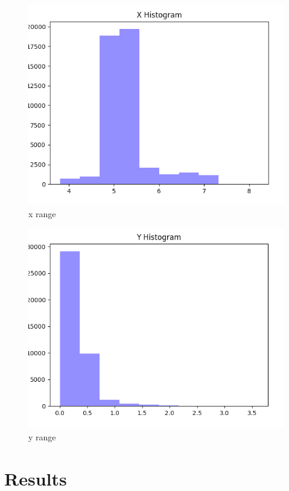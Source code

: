 \documentclass[12pt, a4paper, twocolumn, fullpage]{article}
\theoremstyle{plain}
\theoremstyle{definition}
\theoremstyle{remark}
\begin{document}
\begin{figure}[t]
	\includegraphics[width=\linewidth]{xhist.png}
	\caption{x range}
	\label{fig:boat1}
\end{figure}

\begin{figure}[t]
	\includegraphics[width=\linewidth]{yhist.png}
	\caption{y range}
	\label{fig:boat1}
\end{figure}


\section{Results}
\end{document}
